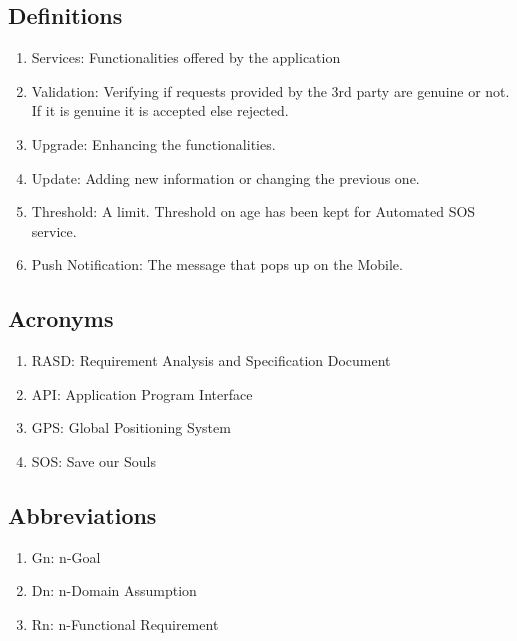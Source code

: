 \subsection{Definitions}
\begin{enumerate}
\item Services: Functionalities offered by the application
\item Validation: Verifying if requests provided by the 3rd party are genuine or not. If it is genuine it is accepted else rejected.
\item Upgrade: Enhancing the functionalities. 
\item Update: Adding new information or changing the previous one.
\item Threshold: A limit. Threshold on age has been kept for Automated SOS service.
\item Push Notification: The message that pops up on the Mobile. 
\end{enumerate}

\subsection{Acronyms}
\begin{enumerate}
\item RASD: Requirement Analysis and Specification Document
\item API: Application Program Interface
\item GPS: Global Positioning System
\item SOS: Save our Souls
\end{enumerate}

\subsection{Abbreviations}
\begin{enumerate}
\item Gn: n-Goal
\item Dn: n-Domain Assumption
\item Rn: n-Functional Requirement 
\end{enumerate}
